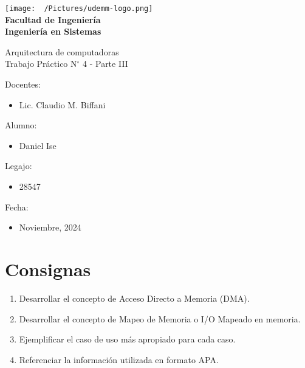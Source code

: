 \documentclass[12pt]{article}
\begin{document}
\thispagestyle{empty}

\begin{center}
	\vspace*{.5cm}
	\texttt{[image: ~/Pictures/udemm-logo.png]}\\
	\vspace{.2cm}
	\Large
	\textbf{Facultad de Ingeniería}\\
	\textbf{Ingeniería en Sistemas}\\
	\vspace{2cm}

	\Huge
	Arquitectura de computadoras 				\\
	Trabajo Práctico N\(^\circ\) 4 - Parte III  \\
	\vfill

	\raggedright
	\Large
	Docentes:
	\begin{itemize}
		\item[] Lic. Claudio M. Biffani
	\end{itemize}
	Alumno:
	\begin{itemize}
		\item[] Daniel Ise
	\end{itemize}
	Legajo:
	\begin{itemize}
		\item[] 28547
	\end{itemize}
	Fecha:
	\begin{itemize}
		\item[] Noviembre, 2024
	\end{itemize}
\end{center}

\pagebreak

\tableofcontents

\pagebreak

\section{Consignas}

\begin{enumerate}
	\item Desarrollar el concepto de Acceso Directo a Memoria (DMA).
	\item Desarrollar el concepto de Mapeo de Memoria o I/O Mapeado en memoria.
	\item Ejemplificar el caso de uso más apropiado para cada caso.
	\item Referenciar la información utilizada en formato APA.
\end{enumerate}
\end{document}
